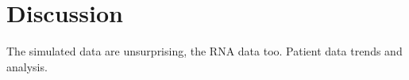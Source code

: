 \section{Discussion} \label{sec:discuss}
The simulated data are unsurprising, the RNA data too. Patient data trends and analysis.